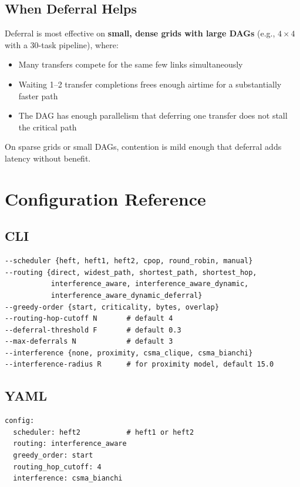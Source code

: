 \documentclass[11pt]{article}
\begin{document}
\subsection{When Deferral Helps}

Deferral is most effective on \textbf{small, dense grids with large DAGs}
(e.g., $4\times4$ with a 30-task pipeline), where:
\begin{itemize}
\item Many transfers compete for the same few links simultaneously
\item Waiting 1--2 transfer completions frees enough airtime for a
      substantially faster path
\item The DAG has enough parallelism that deferring one transfer does not
      stall the critical path
\end{itemize}

On sparse grids or small DAGs, contention is mild enough that deferral adds
latency without benefit.

\section{Configuration Reference}

\subsection{CLI}

\begin{lstlisting}
--scheduler {heft, heft1, heft2, cpop, round_robin, manual}
--routing {direct, widest_path, shortest_path, shortest_hop,
           interference_aware, interference_aware_dynamic,
           interference_aware_dynamic_deferral}
--greedy-order {start, criticality, bytes, overlap}
--routing-hop-cutoff N       # default 4
--deferral-threshold F       # default 0.3
--max-deferrals N            # default 3
--interference {none, proximity, csma_clique, csma_bianchi}
--interference-radius R      # for proximity model, default 15.0
\end{lstlisting}

\subsection{YAML}

\begin{lstlisting}
config:
  scheduler: heft2           # heft1 or heft2
  routing: interference_aware
  greedy_order: start
  routing_hop_cutoff: 4
  interference: csma_bianchi
\end{lstlisting}
\end{document}

